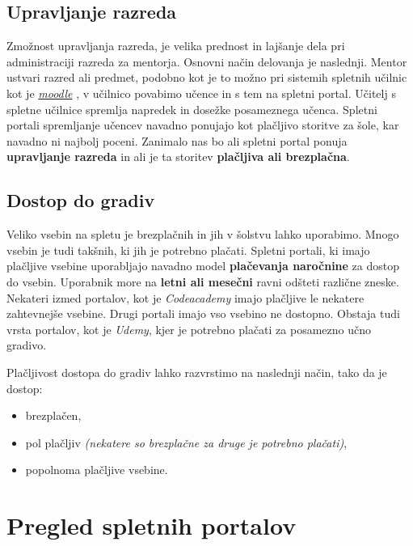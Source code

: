\subsection{Upravljanje razreda}
\label{sec:upravljanje_razreda}

Zmožnost upravljanja razreda, je velika prednost in lajšanje dela pri
administraciji razreda za mentorja. Osnovni način delovanja je
naslednji. Mentor ustvari razred ali predmet, podobno kot je to možno
pri sistemih spletnih učilnic kot je
\emph{\href{https://moodle.org/}{moodle}} \cite{web:moodle_site}, v
učilnico povabimo učence in s tem na spletni portal. Učitelj s spletne
učilnice spremlja napredek in dosežke posameznega učenca. Spletni
portali spremljanje učencev navadno ponujajo kot plačljivo storitve za
šole, kar navadno ni najbolj poceni. Zanimalo nas bo ali spletni
portal ponuja \textbf{upravljanje razreda} in ali je ta storitev
\textbf{plačljiva ali brezplačna}.

\subsection{Dostop do gradiv}
\label{sec:dostop_do_gradiv}

Veliko vsebin na spletu je brezplačnih in jih v šolstvu lahko
uporabimo. Mnogo vsebin je tudi takšnih, ki jih je potrebno
plačati. Spletni portali, ki imajo plačljive vsebine uporabljajo
navadno model \textbf{plačevanja naročnine} za dostop do
vsebin. Uporabnik more na \textbf{letni ali mesečni} ravni odšteti
različne zneske. Nekateri izmed portalov, kot je \emph{Codeacademy}
imajo plačljive le nekatere zahtevnejše vsebine. Drugi portali imajo
vso vsebino ne dostopno. Obstaja tudi vrsta portalov, kot je
\emph{Udemy}, kjer je potrebno plačati za posamezno učno gradivo.

Plačljivost dostopa do gradiv lahko razvrstimo na naslednji način,
tako da je dostop:

\begin{itemize}
  \tightlist
\item brezplačen,
\item pol plačljiv \emph{(nekatere so brezplačne za druge je potrebno
    plačati)},
\item popolnoma plačljive vsebine.
\end{itemize}

\section{Pregled spletnih portalov}
\label{sec:pregled_spletnih_port}

